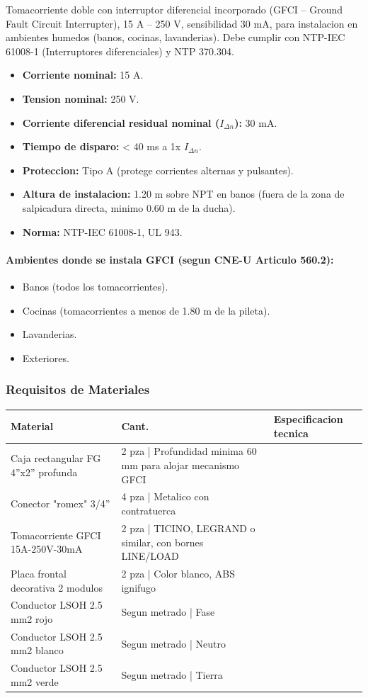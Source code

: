 Tomacorriente doble con interruptor diferencial incorporado (GFCI -- Ground Fault Circuit Interrupter), 15 A -- 250 V, sensibilidad 30 mA, para instalacion en ambientes humedos (banos, cocinas, lavanderias). Debe cumplir con NTP-IEC 61008-1 (Interruptores diferenciales) y NTP 370.304.

\begin{itemize}[nosep]
  \item \textbf{Corriente nominal:} 15 A.
  \item \textbf{Tension nominal:} 250 V.
  \item \textbf{Corriente diferencial residual nominal ($I_{\Delta n}$):} 30 mA.
  \item \textbf{Tiempo de disparo:} < 40 ms a 1x $I_{\Delta n}$.
  \item \textbf{Proteccion:} Tipo A (protege corrientes alternas y pulsantes).
  \item \textbf{Altura de instalacion:} 1.20 m sobre NPT en banos (fuera de la zona de salpicadura directa, minimo 0.60 m de la ducha).
  \item \textbf{Norma:} NTP-IEC 61008-1, UL 943.
\end{itemize}

\paragraph{Ambientes donde se instala GFCI (segun CNE-U Articulo 560.2):}
\begin{itemize}[nosep]
  \item Banos (todos los tomacorrientes).
  \item Cocinas (tomacorrientes a menos de 1.80 m de la pileta).
  \item Lavanderias.
  \item Exteriores.
\end{itemize}

\subsubsection{Requisitos de Materiales}

\begin{longtable}{L{5.0cm} L{2.0cm} L{7.5cm}}
\toprule
\textbf{Material} & \textbf{Cant.} & \textbf{Especificacion tecnica} \\
\midrule
Caja rectangular FG 4''x2'' profunda & 2 pza | Profundidad minima 60 mm para alojar mecanismo GFCI \\
Conector "romex" 3/4'' & 4 pza | Metalico con contratuerca \\
Tomacorriente GFCI 15A-250V-30mA & 2 pza | TICINO, LEGRAND o similar, con bornes LINE/LOAD \\
Placa frontal decorativa 2 modulos & 2 pza | Color blanco, ABS ignifugo \\
Conductor LSOH 2.5 mm2 rojo & Segun metrado | Fase \\
Conductor LSOH 2.5 mm2 blanco & Segun metrado | Neutro \\
Conductor LSOH 2.5 mm2 verde & Segun metrado | Tierra \\
\bottomrule
\end{longtable}

